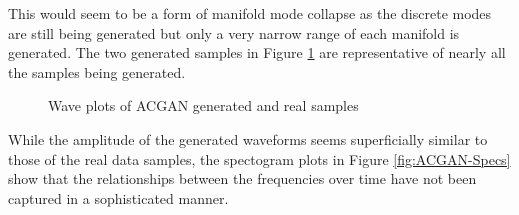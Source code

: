 \documentclass[a4paper, titlepage]{article}
\begin{document}
This would seem to be a form of manifold mode collapse as the discrete modes are still being generated but only a very narrow range of each manifold is generated.
The two generated samples in Figure \ref{fig:ACGAN-Waves} are representative of nearly all the samples being generated.
\newline
%
\begin{figure}[ht]%
    \centering
    \qquad
    \qquad
    \qquad
    \caption{Wave plots of ACGAN generated and real samples}%
    \label{fig:ACGAN-Waves}%
\end{figure}
%
\newline
While the amplitude of the generated waveforms seems superficially similar to those of the real data samples, the spectogram plots in Figure \ref{fig:ACGAN-Specs} show that the relationships between the frequencies over time have not been captured in a sophisticated manner.
\end{document}
